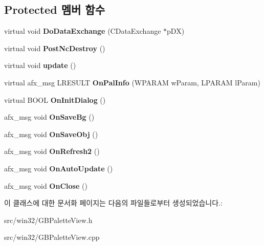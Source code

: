 \subsection*{Protected 멤버 함수}
\begin{DoxyCompactItemize}
\item 
\mbox{\label{class_g_b_palette_view_a44dd90ae3c09c4fb0b2788a4c0577634}} 
virtual void {\bfseries Do\+Data\+Exchange} (C\+Data\+Exchange $\ast$p\+DX)
\item 
\mbox{\label{class_g_b_palette_view_a076a96cf195fe071e3050704636247ff}} 
virtual void {\bfseries Post\+Nc\+Destroy} ()
\item 
\mbox{\label{class_g_b_palette_view_a43a43edd82e080e860aeb6a82ec106fc}} 
virtual void {\bfseries update} ()
\item 
\mbox{\label{class_g_b_palette_view_a01960a28d93aef1873f5d5256fa11c79}} 
virtual afx\+\_\+msg L\+R\+E\+S\+U\+LT {\bfseries On\+Pal\+Info} (W\+P\+A\+R\+AM w\+Param, L\+P\+A\+R\+AM l\+Param)
\item 
\mbox{\label{class_g_b_palette_view_a8d71e7140c51c2a7a81c39398497e61e}} 
virtual B\+O\+OL {\bfseries On\+Init\+Dialog} ()
\item 
\mbox{\label{class_g_b_palette_view_a0186b41f6db460271256f36800ffa980}} 
afx\+\_\+msg void {\bfseries On\+Save\+Bg} ()
\item 
\mbox{\label{class_g_b_palette_view_a20eb0c24604804e9c33db15f3ff394f0}} 
afx\+\_\+msg void {\bfseries On\+Save\+Obj} ()
\item 
\mbox{\label{class_g_b_palette_view_a15d94f40712405e466296772b7087f3f}} 
afx\+\_\+msg void {\bfseries On\+Refresh2} ()
\item 
\mbox{\label{class_g_b_palette_view_a8d2c0e66a90accbbe35b286a51857728}} 
afx\+\_\+msg void {\bfseries On\+Auto\+Update} ()
\item 
\mbox{\label{class_g_b_palette_view_a7cbc4954d55851e0991ee4419904fcec}} 
afx\+\_\+msg void {\bfseries On\+Close} ()
\end{DoxyCompactItemize}


이 클래스에 대한 문서화 페이지는 다음의 파일들로부터 생성되었습니다.\+:\begin{DoxyCompactItemize}
\item 
src/win32/G\+B\+Palette\+View.\+h\item 
src/win32/G\+B\+Palette\+View.\+cpp\end{DoxyCompactItemize}
